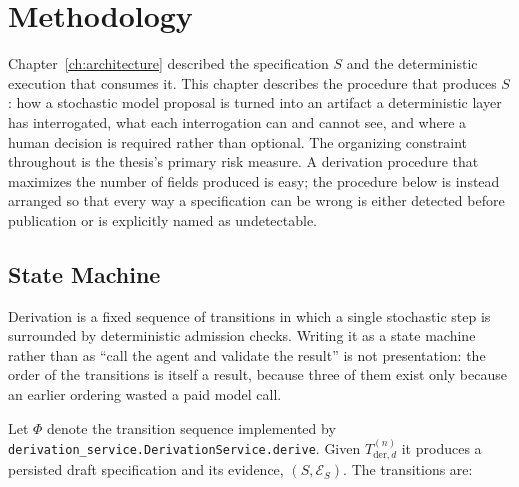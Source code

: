 \chapter{Methodology}
\label{ch:method}

%
%

Chapter~\ref{ch:architecture} described the specification $S$ and the deterministic
execution that consumes it. This chapter describes the procedure that produces $S$: how a
stochastic model proposal is turned into an artifact a deterministic layer has
interrogated, what each interrogation can and cannot see, and where a human decision is
required rather than optional. The organizing constraint throughout is the thesis's primary
risk measure. A derivation procedure that maximizes the number of fields produced is easy;
the procedure below is instead arranged so that every way a specification can be wrong is
either detected before publication or is explicitly named as undetectable.

\section{State Machine}
\label{sec:der:statemachine}

Derivation is a fixed sequence of transitions in which a single stochastic step is
surrounded by deterministic admission checks. Writing it as a state machine rather than as
``call the agent and validate the result'' is not presentation: the order of the transitions
is itself a result, because three of them exist only because an earlier ordering wasted a
paid model call.

Let $\Phi$ denote the transition sequence implemented by
\texttt{derivation\_service.DerivationService.derive}. Given $T_{\mathrm{der},d}^{(n)}$ it
produces a persisted draft specification and its evidence, $(S,\mathcal{E}_S)$. The
transitions are:


